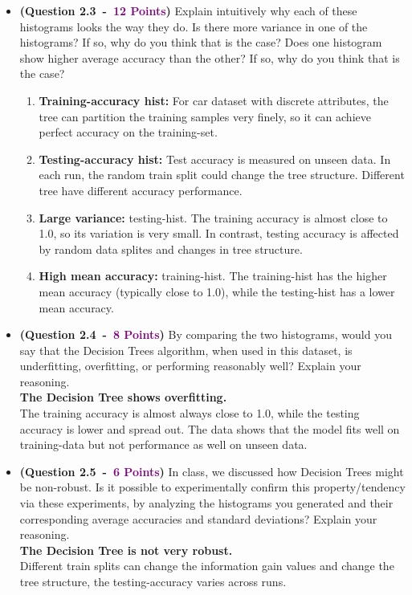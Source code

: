 \documentclass{article}
\newcommand{\POINTS}[1]{\textcolor{purple}{\textbf{{#1}}}}
\begin{document}
\begin{itemize}
    \item \textbf{(Question 2.3~-~\POINTS{12 Points})} Explain intuitively why each of these histograms looks the way they do. Is there more variance in one of the histograms? If so, why do you think that is the case? Does one histogram show higher average accuracy than the other? If so, why do you think that is the case?
\begin{enumerate}
    \item \textbf{Training-accuracy hist:} For car dataset with discrete attributes, the tree can partition the training samples very finely, so it can achieve perfect accuracy on the training-set.
    \item \textbf{Testing-accuracy hist:} Test accuracy is measured on unseen data. In each run, the random train split could change the tree structure. Different tree have different accuracy performance.
    \item \textbf{Large variance: }testing-hist. The training accuracy is almost close to 1.0, so its variation is very small. In contrast, testing accuracy is affected by random data splites and changes in tree structure.
    \item \textbf{High mean accuracy: }training-hist. The training-hist has the higher mean accuracy (typically close to 1.0), while the testing-hist has a lower mean accuracy.
\end{enumerate}



    \item \textbf{(Question 2.4~-~\POINTS{8 Points})} By comparing the two histograms, would you say that the Decision Trees algorithm, when used in this dataset, is underfitting, overfitting, or performing reasonably well? Explain your reasoning.
\\
\textbf{The Decision Tree shows overfitting.}\\
The training accuracy is almost always close to 1.0, while the testing accuracy is lower and spread out. The data shows that the model fits well on training-data but not performance as well on unseen data.




    \item \textbf{(Question 2.5~-~\POINTS{6 Points})} In class, we discussed how Decision Trees might be non-robust. Is it possible to experimentally confirm this property/tendency via these experiments, by analyzing the histograms you generated and their corresponding average accuracies and standard deviations? Explain your reasoning.
\\
\textbf{The Decision Tree is not very robust.}\\
Different train splits can change the information gain values and change the tree structure, the testing-accuracy varies across runs.




    
\end{itemize}
\end{document}
